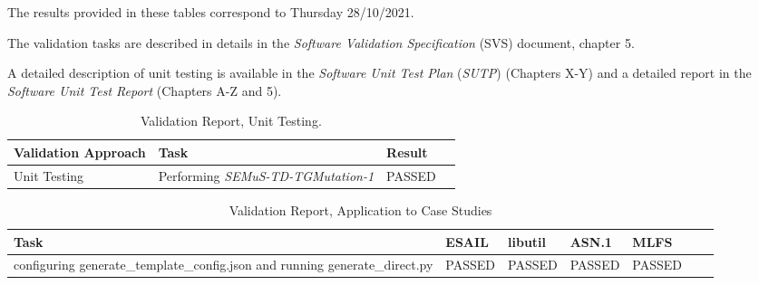 
The results provided in these tables correspond to Thursday 28/10/2021.

The validation tasks are described in details in the \emph{Software Validation Specification} (SVS) document, chapter 5.

A detailed description of \SEMUS unit testing is available in the \emph{Software Unit Test Plan} (\emph{SUTP}) (Chapters X-Y) and a detailed report in the \emph{Software Unit Test Report} (Chapters A-Z and 5).

\begin{table}[h]
\caption{\SEMUS Validation Report, Unit Testing.}
\label{table:semus:unit_results}
\scriptsize
\centering
\begin{tabular}{|l|l|l|l|}
\hline
\textbf{Validation Approach}&\textbf{Task}&\textbf{Result}\\
\hline
Unit Testing&Performing \emph{SEMuS-TD-TGMutation-1}&PASSED\\
\hline
\end{tabular}

\end{table}


\begin{table}[h]
\caption{\SEMUS Validation Report, Application to Case Studies}
\label{table:semus:results}
\scriptsize
\centering
\begin{tabular}{|l|l|l|l|l|l|l|}
\hline
\textbf{Task}&\textbf{ESAIL}&\textbf{libutil}&\textbf{ASN.1}&\textbf{MLFS}\\
\hline
configuring generate\_template\_config.json and running generate\_direct.py &PASSED&PASSED&PASSED&PASSED\\
\hline
\end{tabular}

\end{table}


